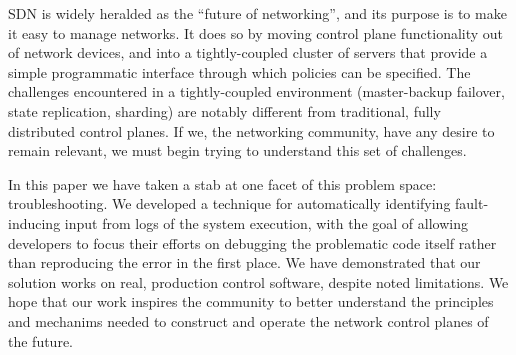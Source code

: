 
SDN is widely heralded as the ``future of networking'', and its purpose is to make
it easy to manage networks. It does so by moving control plane functionality out of
network devices, and into a tightly-coupled cluster of servers that provide a simple
programmatic interface through which policies can be specified. The challenges encountered
in a tightly-coupled environment (master-backup failover, state replication, sharding) are
notably different from traditional, fully distributed control planes. If we,
the networking community, have any desire to remain relevant, we must begin trying
to understand this set of challenges.

In this paper we have taken a stab at one facet of this problem space:
troubleshooting. We developed a technique for automatically
identifying fault-inducing input from logs of the system execution, with the
goal of allowing developers to focus their efforts on debugging the problematic
code itself rather than reproducing the error in the first place. We have
demonstrated that our solution works on real, production control software,
despite noted limitations. We hope that our work inspires the community to
better understand the principles and mechanims needed to construct and
operate the network control planes of the future.

